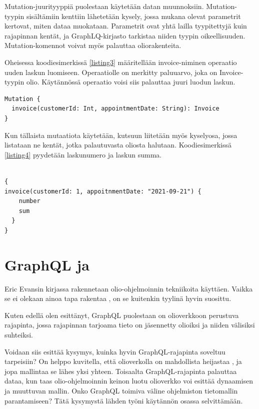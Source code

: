 Mutation-juurityyppiä puolestaan käytetään datan muunnoksiin.
Mutation-tyypin sisältämiin kenttiin lähetetään kysely, jossa mukana
olevat parametrit kertovat, miten dataa muokataan. Parametrit ovat yhtä
lailla tyypitettyjä kuin rajapinnan kentät, ja GraphLQ-kirjasto
tarkistaa niiden tyypin oikeellisuuden. Mutation-komennot voivat myös
palauttaa oliorakenteita.

Oheisessa koodiesimerkissä \ref{listing3} määritellään invoice-niminen
operaatio uuden laskun luomiseen. Operaatiolle on merkitty paluuarvo,
joka on Invoice-tyypin olio. Käytännössä operaatio voisi siis palauttaa
juuri luodun laskun.

\begin{code}
  \begin{verbatim}
Mutation {
  invoice(customerId: Int, appointmentDate: String): Invoice
}
\end{verbatim}
  \label{listing3}
\end{code}

Kun tällaista mutaatiota käytetään, kutsuun liitetään myös kyselyosa,
jossa listataan ne kentät, jotka palautuvasta oliosta halutaan.
Koodiesimerkissä \ref{listing4} pyydetään laskunumero ja laskun summa.

\begin{code}
  \begin{verbatim}

{
invoice(customerId: 1, appoitnmentDate: "2021-09-21") {
    number
    sum
  }
}
\end{verbatim}
  \label{listing4}
\end{code}

\hypertarget{graphql-ja}{%
\section{\texorpdfstring{GraphQL ja
}{GraphQL ja }}\label{graphql-ja}}

Eric Evansin kirjassa  rakennetaan
olio-ohjelmoinnin tekniikoita käyttäen. Vaikka se ei olekaan ainoa tapa
rakentaa , on se kuitenkin tyylinä hyvin
suosittu.

Kuten edellä olen esittänyt, GraphQL puolestaan on olioverkkoon
perustuva rajapinta, jossa rajapinnan tarjoama tieto on jäsennetty
olioiksi ja niiden välisiksi suhteiksi.

Voidaan siis esittää kysymys, kuinka hyvin GraphQL-rajapinta soveltuu
 tarpeisiin? On helppo
kuvitella, että olioverkolla on mahdollista heijastaa
, ja jopa mallintaa se lähes yksi yhteen.
Toisaalta GraphQL-rajapinta palauttaa dataa, kun taas olio-ohjelmoinnin
keinon luotu olioverkko voi esittää dynaamisen ja muuttuvan mallin. Onko
GraphQL toimiva väline ohjelmiston tietomallin parantamiseen? Tätä
kysymystä lähden työni käytännön osassa selvittämään.
